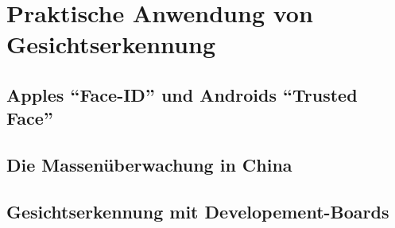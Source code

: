 \section{Praktische Anwendung von Gesichtserkennung}
\label{sec:Praltische_Anwendung_Kuenslicher_Intelligenz}

    \subsection{Apples \enquote{Face-ID} und Androids \enquote{Trusted Face}}

    \subsection{Die Massenüberwachung in China}

    \subsection{Gesichtserkennung mit Developement-Boards}